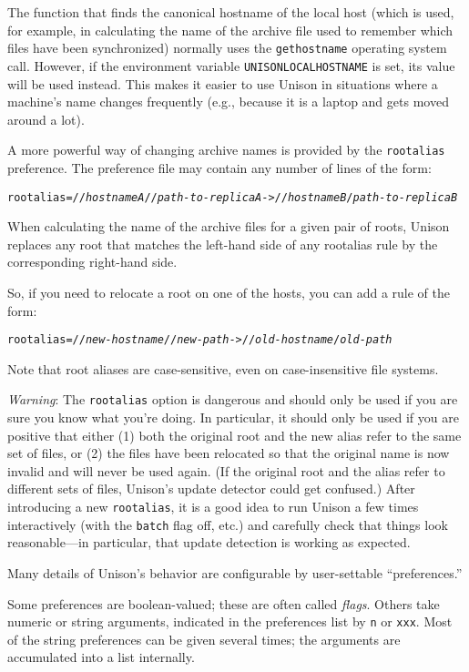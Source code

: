 \documentclass{article}
\newcommand{\NT}[1]{\textit{#1}}
\begin{document}
The function that finds the canonical hostname of the local host (which
is used, for example, in calculating the name of the archive file used to
remember which files have been synchronized) normally uses the
\verb|gethostname| operating system call.  However, if the environment
variable \verb|UNISONLOCALHOSTNAME| is set, its value will be used
instead.  This makes it easier to use Unison in situations where a
machine's name changes frequently (e.g., because it is a laptop and gets
moved around a lot).

A more powerful way of changing archive names is provided by the
\verb|rootalias| preference.  The preference file may contain any number of
lines of the form: 
\begin{alltt}
    rootalias = //\NT{hostnameA}//\NT{path-to-replicaA} -> //\NT{hostnameB}/\NT{path-to-replicaB}
\end{alltt}
When calculating the name of the archive files for a given pair of roots,
Unison replaces any root that matches the left-hand side of any rootalias
rule by the corresponding right-hand side.

So, if you need to relocate a root on one of the hosts, you can add a
rule of the form:
\begin{alltt}
    rootalias = //\NT{new-hostname}//\NT{new-path} -> //\NT{old-hostname}/\NT{old-path}
\end{alltt}
Note that root aliases are case-sensitive, even on case-insensitive file
systems.

{\em Warning}: The \verb|rootalias| option is dangerous and should only
be used if you are sure you know what you're doing.  In particular, it
should only be used if you are positive that either (1) both the original
root and the new alias refer to the same set of files, or (2) the files
have been relocated so that the original name is now invalid and will
never be used again.  (If the original root and the alias refer to
different sets of files, Unison's update detector could get confused.)
%
After introducing a new \verb|rootalias|, it is a good idea to run Unison
a few times interactively (with the \verb|batch| flag off, etc.) and
carefully check that things look reasonable---in particular, that update
detection is working as expected.



Many details of Unison's behavior are configurable by user-settable
``preferences.''  

Some preferences are boolean-valued; these are often called {\em flags}.
Others take numeric or string arguments, indicated in the preferences
list by {\tt n} or {\tt xxx}.  Most of the string preferences can be
given several times; the arguments are accumulated into a list
internally.
\end{document}
